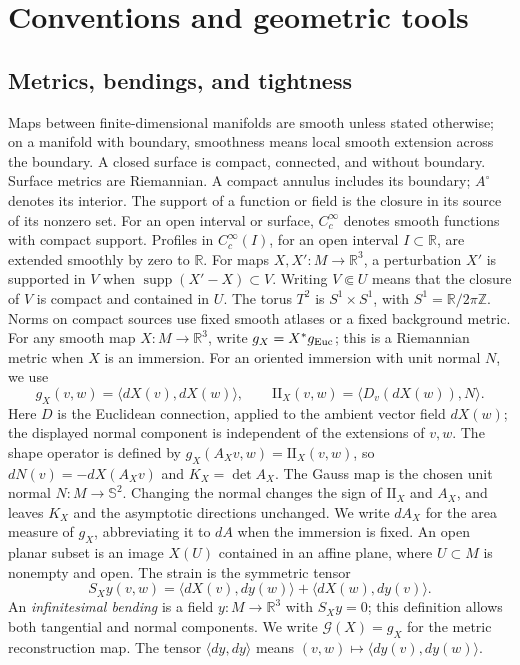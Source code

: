 \documentclass[11pt]{amsart}
\theoremstyle{definition}
\theoremstyle{remark}
\newcommand{\R}{\mathbb R}\newcommand{\Sph}{\mathbb S}
\DeclareMathOperator{\supp}{supp}
\newcommand{\II}{\mathrm{II}}\newcommand{\Gmap}{\mathcal G}
\numberwithin{equation}{section}
\begin{document}
\section{Conventions and geometric tools}\label{sec:prelim}
\subsection{Metrics, bendings, and tightness}
Maps between finite-dimensional manifolds are smooth unless stated
otherwise; on a manifold with boundary, smoothness means local smooth
extension across the boundary. A closed surface is compact, connected,
and without boundary. Surface metrics are Riemannian. A compact annulus
includes its boundary; $A^\circ$ denotes
its interior. The support of a function or field is the closure in its
source of its nonzero set. For an open interval or surface,
$C_c^\infty$ denotes smooth functions with compact support.
Profiles in $C_c^\infty(I)$, for an open interval $I\subset\R$, are
extended smoothly by zero to $\R$.
For maps $X,X':M\to\R^3$, a perturbation $X'$ is supported in $V$
when $\supp(X'-X)\subset V$.
Writing $V\Subset U$ means that the closure of $V$ is compact and
contained in $U$. The torus $T^2$ is $S^1\times S^1$, with
$S^1=\R/2\pi\mathbb Z$.
Norms on compact sources use fixed smooth atlases or a fixed background
metric. For any smooth map $X:M\to\R^3$, write $g_X=X^*g_{\rm Euc}$;
this is a Riemannian metric when $X$ is an immersion. For an oriented
immersion with unit normal $N$, we use
\[
 g_X(v,w)=\langle dX(v),dX(w)\rangle,\qquad
 \II_X(v,w)=\langle D_v(dX(w)),N\rangle.
\]
Here $D$ is the Euclidean connection, applied to the ambient vector
field $dX(w)$; the displayed normal component is independent of the
extensions of $v,w$. The shape operator is defined by
$g_X(A_Xv,w)=\II_X(v,w)$, so $dN(v)=-dX(A_Xv)$ and $K_X=\det A_X$.
The Gauss map is the chosen unit normal $N:M\to\Sph^2$.
Changing the normal changes the sign of $\II_X$ and $A_X$, and leaves
$K_X$ and the asymptotic directions unchanged. We write $dA_X$ for the
area measure of $g_X$, abbreviating it to $dA$ when the immersion is fixed.
An open planar subset is an image $X(U)$ contained in an affine plane,
where $U\subset M$ is nonempty and open. The strain is the symmetric tensor
\[
 S_Xy(v,w)=\langle dX(v),dy(w)\rangle+
             \langle dX(w),dy(v)\rangle.
\]
An \emph{infinitesimal bending} is a field $y:M\to\R^3$ with $S_Xy=0$;
this definition allows both tangential and normal components. We write
$\Gmap(X)=g_X$ for the metric reconstruction map. The tensor
$\langle dy,dy\rangle$ means $(v,w)\mapsto\langle dy(v),dy(w)\rangle$.
\end{document}
